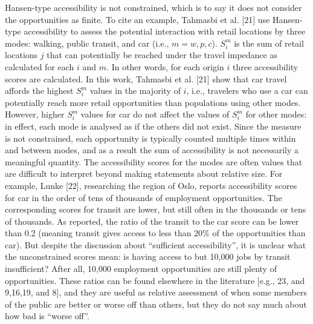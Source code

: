 \documentclass[10pt,letterpaper]{article}
\begin{document}
Hansen-type accessibility is not constrained, which is to say it does
not consider the opportunities as finite. To cite an example, Tahmasbi
et al. {[}21{]} use Hansen-type accessibility to assess the potential
interaction with retail locations by three modes: walking, public
transit, and car (i.e., \(m = w, p, c\)). \(S_i^m\) is the sum of retail
locations \(j\) that can potentially be reached under the travel
impedance as calculated for each \(i\) and \(m\). In other words, for
each origin \(i\) three accessibility scores are calculated. In this
work, Tahmasbi et al. {[}21{]} show that car travel affords the highest
\(S_i^{m}\) values in the majority of \(i\), i.e., travelers who use a
car can potentially reach more retail opportunities than populations
using other modes. However, higher \(S_i^{m}\) values for car do not
affect the values of \(S_i^{m}\) for other modes: in effect, each mode
is analysed as if the others did not exist. Since the measure is not
constrained, each opportunity is typically counted multiple times within
and between modes, and as a result the sum of accessibility is not
necessarily a meaningful quantity. The accessibility scores for the
modes are often values that are difficult to interpret beyond making
statements about relative size. For example, Lunke {[}22{]}, researching
the region of Oslo, reports accessibility scores for car in the order of
tens of thousands of employment opportunities. The corresponding scores
for transit are lower, but still often in the thousands or tens of
thousands. As reported, the ratio of the transit to the car score can be
lower than 0.2 (meaning transit gives access to less than 20\% of the
opportunities than car). But despite the discussion about ``sufficient
accessibility'', it is unclear what the unconstrained scores mean: is
having access to but 10,000 jobs by transit insufficient? After all,
10,000 employment opportunities are still plenty of opportunities. These
ratios can be found elsewhere in the literature {[}e.g., 23, and
9,16,19, and 8{]}, and they are useful as relative assessment of when
some members of the public are better or worse off than others, but they
do not say much about how bad is ``worse off''.
\end{document}
